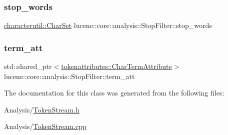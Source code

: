 \subsubsection{\texorpdfstring{stop\+\_\+words}{stop\_words}}
{\footnotesize\ttfamily \mbox{\hyperlink{classlucene_1_1core_1_1analysis_1_1characterutil_1_1CharSet}{characterutil\+::\+Char\+Set}} lucene\+::core\+::analysis\+::\+Stop\+Filter\+::stop\+\_\+words\hspace{0.3cm}{\ttfamily [private]}}

\mbox{\label{classlucene_1_1core_1_1analysis_1_1StopFilter_aa625432d1343f5a67be010bde710a986}} 
\subsubsection{\texorpdfstring{term\+\_\+att}{term\_att}}
{\footnotesize\ttfamily std\+::shared\+\_\+ptr$<$\mbox{\hyperlink{classlucene_1_1core_1_1analysis_1_1tokenattributes_1_1CharTermAttribute}{tokenattributes\+::\+Char\+Term\+Attribute}}$>$ lucene\+::core\+::analysis\+::\+Stop\+Filter\+::term\+\_\+att\hspace{0.3cm}{\ttfamily [private]}}



The documentation for this class was generated from the following files\+:\begin{DoxyCompactItemize}
\item 
Analysis/\mbox{\hyperlink{TokenStream_8h}{Token\+Stream.\+h}}\item 
Analysis/\mbox{\hyperlink{TokenStream_8cpp}{Token\+Stream.\+cpp}}\end{DoxyCompactItemize}
